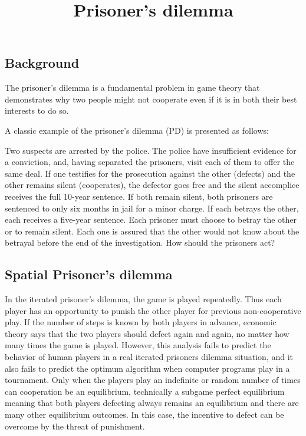 \documentclass[smallheadings,12pt]{scrartcl}
\begin{document}
\parindent0cm
\pagestyle{myheadings}
\title{Prisoner's dilemma}
\lstset{language=Python,numbers=left,frame=shadowbox}

\maketitle

\subsection*{Background}
The prisoner's dilemma is a fundamental problem in game theory that
demonstrates why two people might not cooperate even if it is in both
their best interests to do so.

A classic example of the prisoner's dilemma (PD) is presented as
follows:

Two suspects are arrested by the police. The police have insufficient
evidence for a conviction, and, having separated the prisoners, visit
each of them to offer the same deal. If one testifies for the
prosecution against the other (defects) and the other remains silent
(cooperates), the defector goes free and the silent accomplice
receives the full 10-year sentence. If both remain silent, both
prisoners are sentenced to only six months in jail for a minor
charge. If each betrays the other, each receives a five-year
sentence. Each prisoner must choose to betray the other or to remain
silent. Each one is assured that the other would not know about the
betrayal before the end of the investigation. How should the prisoners
act?

\subsection*{Spatial Prisoner's dilemma}
In the iterated prisoner's dilemma, the game is played
repeatedly. Thus each player has an opportunity to punish the other
player for previous non-cooperative play. If the number of steps is
known by both players in advance, economic theory says that the two
players should defect again and again, no matter how many times the
game is played. However, this analysis fails to predict the behavior
of human players in a real iterated prisoners dilemma situation, and
it also fails to predict the optimum algorithm when computer programs
play in a tournament. Only when the players play an indefinite or
random number of times can cooperation be an equilibrium, technically
a subgame perfect equilibrium meaning that both players defecting
always remains an equilibrium and there are many other equilibrium
outcomes. In this case, the incentive to defect can be overcome by the
threat of punishment.
\end{document}
